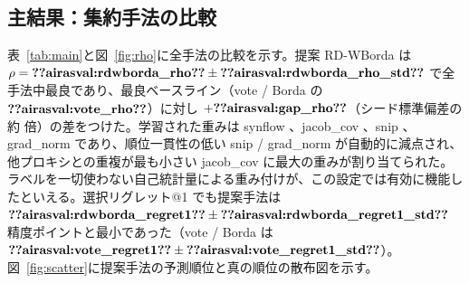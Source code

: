 \documentclass[11pt]{article}
\begin{document}
\subsection{主結果：集約手法の比較}
表~\ref{tab:main}と図~\ref{fig:rho}に全手法の比較を示す。提案 RD-WBorda は $\rho = \airasval{rdwborda_rho} \pm \airasval{rdwborda_rho_std}$ で全手法中最良であり、最良ベースライン（vote / Borda の $\airasval{vote_rho}$）に対し $+\airasval{gap_rho}$（シード標準偏差の約  倍）の差をつけた。学習された重みは synflow 、jacob\_cov 、snip 、grad\_norm  であり、順位一貫性の低い snip / grad\_norm が自動的に減点され、他プロキシとの重複が最も小さい jacob\_cov に最大の重みが割り当てられた。ラベルを一切使わない自己統計量による重み付けが、この設定では有効に機能したといえる。選択リグレット@1 でも提案手法は $\airasval{rdwborda_regret1} \pm \airasval{rdwborda_regret1_std}$ 精度ポイントと最小であった（vote / Borda は $\airasval{vote_regret1} \pm \airasval{vote_regret1_std}$）。図~\ref{fig:scatter}に提案手法の予測順位と真の順位の散布図を示す。
\end{document}

